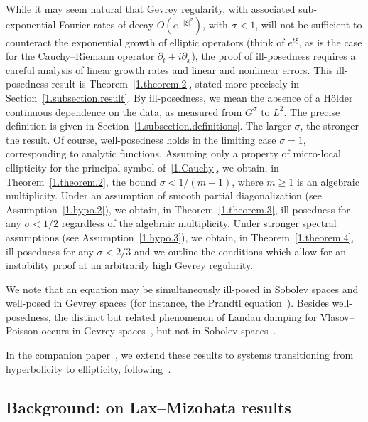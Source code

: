 \documentclass[10pt]{amsart}
\theoremstyle{definition}
\theoremstyle{plain}
\newcommand{\dptl}{\partial}%
\begin{document}
While it may seem natural that Gevrey regularity, with associated sub-exponential Fourier rates of decay $O\left(e^{-|\xi|^{\sigma}} \right)$, with $\sigma <1$, will not be sufficient to counteract the exponential growth of elliptic operators (think of $e^{t\xi}$, as is the case for the Cauchy--Riemann operator $\dptl_{t} + i\dptl_{x}$), the proof of ill-posedness requires a careful analysis of linear growth rates and linear and nonlinear errors. This ill-posedness result is Theorem~\ref{1.theorem.2}, stated more precisely in Section~\ref{1.subsection.result}. By ill-posedness, we mean the absence of a H\"older continuous dependence on the data, as measured from $G^{\sigma}$ to $L^2$. The precise definition is given in Section~\ref{1.subsection.definitions}. The larger $\sigma$, the stronger the result. Of course, well-posedness holds in the limiting case $\sigma=1$, corresponding to analytic functions. Assuming only a property of micro-local ellipticity for the principal symbol of~\eqref{1.Cauchy}, we obtain, in Theorem~\ref{1.theorem.2}, the bound $\sigma < 1/(m + 1)$, where $m \geq 1$ is an algebraic multiplicity. Under an assumption of smooth partial diagonalization (see Assumption~\ref{1.hypo.2}), we obtain, in Theorem~\ref{1.theorem.3}, ill-posedness for any $\sigma <1/2$ regardless of the algebraic multiplicity. Under stronger spectral assumptions (see Assumption~\ref{1.hypo.3}), we obtain, in Theorem~\ref{1.theorem.4}, ill-posedness for any $\sigma < 2/3$ and we outline the conditions which allow for an instability proof at an arbitrarily high Gevrey regularity.

We note that an equation may be simultaneously ill-posed in Sobolev spaces and well-posed in Gevrey spaces (for instance, the Prandtl equation~\cite{gerard2010ill,gerard2013well}). Besides well-posedness, the distinct but related phenomenon of Landau damping for Vlasov--Poisson occurs in Gevrey spaces~\cite{bedrossian2013landau,mouhot2010landau}, but not in Sobolev spaces~\cite{bedrossian2016nonlinear}.

In the companion paper~\cite{morisse2016II}, we extend these results to systems transitioning from hyperbolicity to ellipticity, following~\cite{lerner2010instability,lerner2015onset}.


\subsection{Background: on Lax--Mizohata results}
\end{document}

